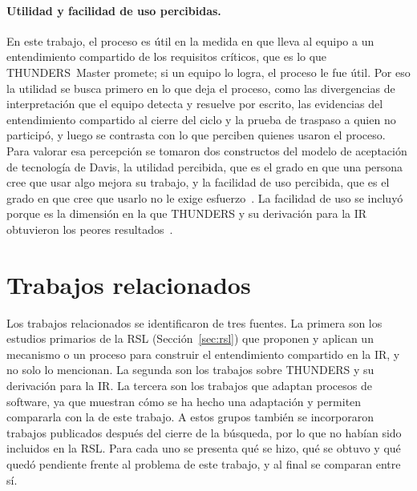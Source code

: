 \documentclass[12pt,letterpaper,oneside]{report}
\begin{document}
\paragraph{Utilidad y facilidad de uso percibidas.}
\label{sec:utilidad}
En este trabajo, el
proceso es útil en la medida en que lleva al equipo a un entendimiento
compartido de los requisitos críticos, que es lo que THUNDERS~Master promete;
si un equipo lo logra, el proceso le fue útil. Por eso la utilidad se busca
primero en lo que deja el proceso, como las divergencias de interpretación
que el equipo detecta y resuelve por escrito, las evidencias del entendimiento compartido
al cierre del ciclo y la prueba de traspaso a quien no participó, y luego se
contrasta con lo que perciben quienes usaron el proceso. Para valorar esa percepción se
tomaron dos constructos del modelo de aceptación de tecnología de Davis, la
utilidad percibida, que es el grado en que una persona cree que usar algo mejora
su trabajo, y la facilidad de uso percibida, que es el grado en que cree que
usarlo no le exige esfuerzo~\cite{davis1989perceived}. La facilidad de uso se
incluyó porque es la dimensión en la que THUNDERS y su derivación para la IR
obtuvieron los peores resultados~\cite{agredo2022thesis,agredo2023strategy}.

\section{Trabajos relacionados}
\label{sec:trabajos_relacionados}
Los trabajos relacionados se identificaron de tres fuentes. La primera son los
estudios primarios de la RSL (Sección~\ref{sec:rsl}) que proponen y aplican un
mecanismo o un proceso para construir el entendimiento compartido en la IR, y no
solo lo mencionan. La segunda son los trabajos sobre THUNDERS y su derivación
para la IR. La tercera son los trabajos que adaptan procesos de software, ya que
muestran cómo se ha hecho una adaptación y permiten compararla con la de este
trabajo. A estos grupos también se incorporaron trabajos publicados después del 
cierre de la búsqueda, por lo que no habían sido incluidos en la RSL. Para cada uno se presenta qué se hizo, qué se obtuvo y qué quedó
pendiente frente al problema de este trabajo, y al final se comparan
entre sí.
\end{document}
